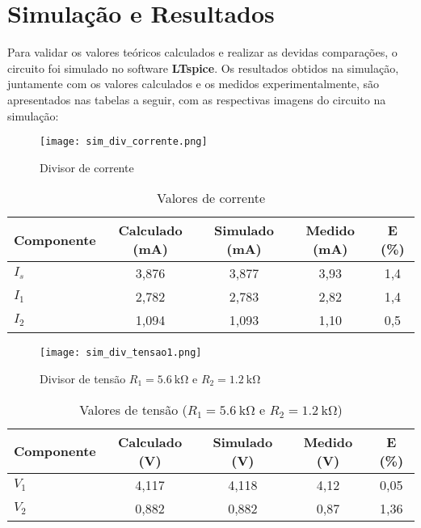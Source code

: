 \documentclass[a4paper, 12pt]{article}
\begin{document}
\section{Simulação e Resultados}
Para validar os valores teóricos calculados e realizar as devidas comparações, o circuito foi simulado no software \textbf{LTspice}. Os resultados obtidos na simulação, juntamente com os valores calculados e os medidos experimentalmente, são apresentados nas tabelas a seguir, com as respectivas imagens do circuito na simulação:

\begin{figure}[H]
\centering
\texttt{[image: sim\_div\_corrente.png]}
\caption{Divisor de corrente}
\label{fig:sim_div_corrente}
\end{figure}

\begin{table}[H]
\centering
\caption{Valores de corrente}
\label{tab:correntes_div}
\begin{tabular}{|l|c|c|c|c|}
\hline
\textbf{Componente} & \textbf{Calculado (\si{\milli\ampere})} & \textbf{Simulado (\si{\milli\ampere})} & \textbf{Medido (\si{\milli\ampere})} & \textbf{E (\%)} \\
\hline
$I_s$ & 3,876 & 3,877 & 3,93 & 1,4 \\ \hline
$I_1$ & 2,782 & 2,783 & 2,82 & 1,4 \\ \hline
$I_2$ & 1,094 & 1,093 & 1,10 & 0,5 \\ \hline
\end{tabular}
\end{table}

\begin{figure}[H]
\centering
\texttt{[image: sim\_div\_tensao1.png]}
\caption{Divisor de tensão $R_1 = \SI{5,6}{\kilo\ohm}$ e $R_2 = \SI{1,2}{\kilo\ohm}$}
\label{fig:sim_div_tensao1}
\end{figure}

\begin{table}[H]
\centering
\caption{Valores de tensão ($R_1 = \SI{5,6}{\kilo\ohm}$ e $R_2 = \SI{1,2}{\kilo\ohm}$)}
\label{tab:tensoes_div1}
\begin{tabular}{|l|c|c|c|c|}
\hline
\textbf{Componente} & \textbf{Calculado (\si{\volt})} & \textbf{Simulado (\si{\volt})} & \textbf{Medido (\si{\volt})} & \textbf{E (\%)} \\
\hline
$V_1$ & 4,117 & 4,118 & 4,12 & 0,05 \\ \hline
$V_2$ & 0,882 & 0,882 & 0,87 & 1,36 \\ \hline
\end{tabular}
\end{table}
\end{document}

